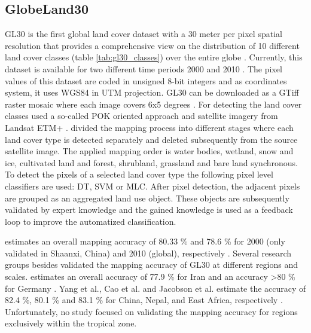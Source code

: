 	\subsection{GlobeLand30}
		\ac{GL30} is the first global land cover dataset with a 30 meter per pixel spatial resolution that provides a comprehensive view on the distribution of 10 different land cover classes (table \ref{tab:gl30_classes}) over the entire globe \citep{Chen2017}. Currently, this dataset is available for two different time periods 2000 and 2010 \citep{Chen2015}. The pixel values of this dataset are coded in unsigned 8-bit integers and as coordinates system, it uses \ac{WGS84} in \ac{UTM} projection. \ac{GL30} can be downloaded as a \ac{GTiff} raster mosaic where each image covers 6x5 degrees \citep{Chen2014}. For detecting the land cover classes \citeauthor{Chen2015} used a so-called \ac{POK} oriented approach and satellite imagery from Landsat \ac{ETM+} \citep{Chen2015}. \citeauthor{Chen2015} divided the mapping process into different stages where each land cover type is detected separately and deleted subsequently from the source satellite image. The applied mapping order is water bodies, wetland, snow and ice, cultivated land and forest, shrubland, grassland and bare land synchronous. To detect the pixels of a selected land cover type the following pixel level classifiers are used: \ac{DT}, \ac{SVM} or \ac{MLC}. After pixel detection, the adjacent pixels are grouped as an aggregated land use object. These objects are subsequently validated by expert knowledge and the gained knowledge is used as a feedback loop to improve the automatized classification.

		\citeauthor{Chen2015} estimates an overall mapping accuracy of 80.33 \% and 78.6 \% for 2000 (only validated in Shaanxi, China) and 2010 (global), respectively \citep{Chen2015}. Several research groups besides \citeauthor{Chen2015} validated the mapping accuracy of \ac{GL30} at different regions and scales. \citeauthor{Arsanjani2016} estimates an overall accuracy of 77.9 \% for Iran and an accuracy >80 \% for Germany \citep{Arsanjani2016a,Arsanjani2016}. Yang et al., Cao et al. and Jacobson et al. estimate the accuracy of 82.4 \%, 80.1 \% and 83.1 \% for China, Nepal, and East Africa, respectively \citep{Yang2017,Cao2016,Jacobson2015}. Unfortunately, no study focused on validating the mapping accuracy for regions exclusively within the tropical zone.

